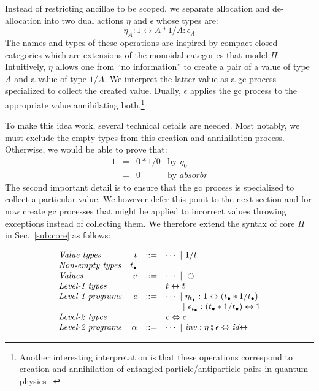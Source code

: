 \documentclass[sigplan,10pt,review,anonymous]{acmart}
\newcommand{\alt}{~|~}
\newcommand{\net}{t_\bullet}
\newcommand{\gcv}{\circlearrowright}
\newcommand{\oneover}[1]{1/#1}
\newcommand{\absorbr}{\mathit{absorbr}}
\newcommand{\idc}{\mathit{id}\!\!\leftrightarrow}
\begin{document}
Instead of restricting ancillae to be scoped, we separate allocation
and de-allocation into two dual actions $\eta$ and $\epsilon$ whose
types are:
\[
\eta_A : 1 \leftrightarrow A * \oneover{A} : \epsilon_A
\]
The names and types of these operations are inspired by compact closed
categories which are extensions of the monoidal categories that model
$\Pi$. Intuitively, $\eta$ allows one from ``no information'' to
create a pair of a value of type $A$ and a value of type
$\oneover{A}$. We interpret the latter value as a gc process
specialized to collect the created value. Dually, $\epsilon$ applies
the gc process to the appropriate value annihilating
both.\footnote{Another interesting interpretation is that these
  operations correspond to creation and annihilation of entangled
  particle/antiparticle pairs in quantum
  physics~\cite{Panangaden2011}.}

To make this idea work, several technical details are needed. Most
notably, we must exclude the empty types from this creation and
annihilation process. Otherwise, we would be able to prove that:
\[\begin{array}{rcll}
1 &=& 0 * 1/0 & \textrm{by~} \eta_0 \\
&=& 0 & \textrm{by~} \absorbr
\end{array}\]
The second important detail is to ensure that the gc process is
specialized to collect a particular value. We however defer this point to
the next section and for now create gc processes that might be applied
to incorrect values throwing exceptions instead of collecting them. We
therefore extend the syntax of core $\Pi$ in Sec.~\ref{sub:core} as
follows:

\[\begin{array}{lrcl}
\textit{Value types} & t &::=& \cdots \alt \oneover{t} \\
\textit{Non-empty types} & \net \\
\textit{Values}      & v &::=& \cdots \alt \gcv \\
\textit{Level-1 types} &&& t \leftrightarrow t \\
\textit{Level-1 programs} & c &::=& \cdots \alt
   \eta_{\net} : 1 \leftrightarrow (\net * \oneover{\net}) \\
   &&& ~~~~~\alt \epsilon_{\net} : (\net * \oneover{\net}) \leftrightarrow 1 \\
\textit{Level-2 types} &&& c \Leftrightarrow c \\
\textit{Level-2 programs} & \alpha &::=& \cdots 
  \alt \mathit{inv} : \eta \fatsemi \epsilon \Leftrightarrow \idc 
\end{array}\]
\end{document}
